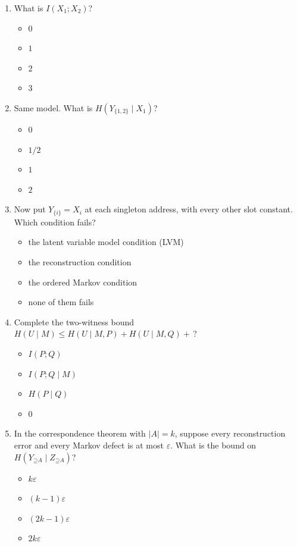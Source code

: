 \documentclass[11pt]{article}
\newcommand{\Up}{\mathord{\supseteq}}
\begin{document}
\begin{enumerate}
\item What is $I(X_1;X_2)$?
\begin{itemize}
\item $0$
\item $1$
\item $2$
\item $3$
\end{itemize}

\item Same model. What is $H(Y_{\{1,2\}}\mid X_1)$?
\begin{itemize}
\item $0$
\item $1/2$
\item $1$
\item $2$
\end{itemize}

\item Now put $Y_{\{i\}}=X_i$ at each singleton address, with every other slot
constant. Which condition fails?
\begin{itemize}
\item the latent variable model condition (LVM)
\item the reconstruction condition
\item the ordered Markov condition
\item none of them fails
\end{itemize}

\item Complete the two-witness bound
$H(U\mid M)\le H(U\mid M,P)+H(U\mid M,Q)+{}$\,?
\begin{itemize}
\item $I(P;Q)$
\item $I(P;Q\mid M)$
\item $H(P\mid Q)$
\item $0$
\end{itemize}

\item In the correspondence theorem with $|A|=k$, suppose every reconstruction
error and every Markov defect is at most $\varepsilon$. What is the bound on
$H(Y_{\Up A}\mid Z_{\Up A})$?
\begin{itemize}
\item $k\varepsilon$
\item $(k-1)\varepsilon$
\item $(2k-1)\varepsilon$
\item $2k\varepsilon$
\end{itemize}


\end{enumerate}
\end{document}
